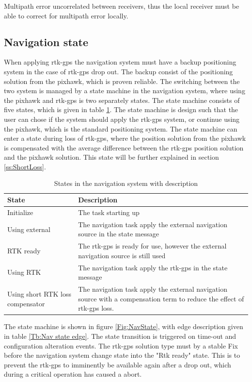 Multipath error uncorrelated between receivers, thus the local receiver must be able to correct for multipath error locally.

\subsection{Navigation state}\label{S:NavState}
When applying \gls{rtk-gps} the navigation system must have a backup positioning system in the case of \gls{rtk-gps} drop out. The backup consist of the positioning solution from the pixhawk, which is proven reliable. The switching between the two system is managed by a state machine in the navigation system, where using the pixhawk and \gls{rtk-gps} is two separately states. The state machine consists of five states, which is given in table \ref{Tb:StateDescription}. The state machine is design such that the user can chose if the system should apply the \gls{rtk-gps} system, or continue using the pixhawk, which is the standard positioning system. The state machine can enter a state during loss of \gls{rtk-gps}, where the position solution from the pixhawk is compensated with the average difference between the \gls{rtk-gps} position solution and the pixhawk solution. This state will be further explained in section \ref{ss:ShortLoss}.
\begin{table}[H]
\begin{tabular}{ | p{3cm} | p{8cm} |}
	\hline 
	\textbf{State}						& \textbf{Description} \\ \hline
	Initialize							& The task starting up\\ \hline
	Using external						& The navigation task apply the external navigation source in the state message\\ \hline
	RTK ready							& The \gls{rtk-gps} is ready for use, however the external navigation source is still used\\ \hline
	Using RTK							& The navigation task apply the \gls{rtk-gps} in the state message\\ \hline
	Using short RTK loss compensator	& The navigation task apply the external navigation source with a compensation term to reduce the effect of \gls{rtk-gps} loss. \\ \hline
\end{tabular}
\caption{States in the navigation system with description}
\label{Tb:StateDescription}
\end{table}
The state machine is shown in figure \ref{Fig:NavState}, with edge description given in table \ref{Tb:Nav state edge}. The state transition is triggered on time-out and configuration alteration events. The \gls{rtk-gps} solution type must by a stable Fix before the navigation system change state into the "Rtk ready" state. This is to prevent the \gls{rtk-gps} to imminently be available again after a drop out, which during a critical operation has caused a abort.
